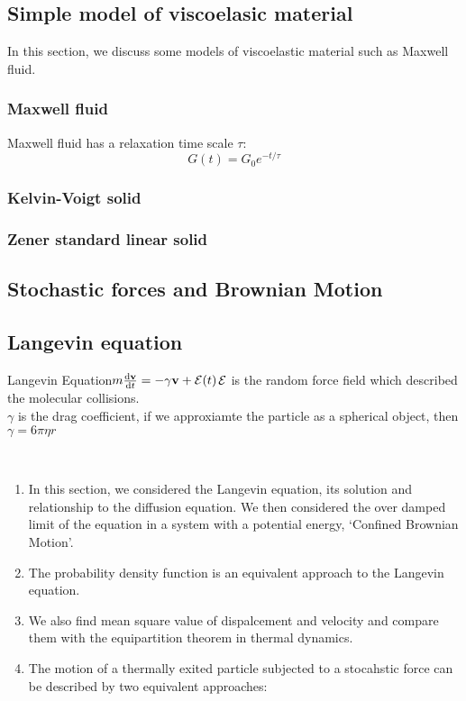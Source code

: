 \documentclass[12pt,a4paper]{article}
\begin{document}
\subsection{Simple model of viscoelasic material}
In this section, we discuss some models of viscoelastic material such as Maxwell fluid. 
    \subsubsection{Maxwell fluid}
    Maxwell fluid has a relaxation time scale $\tau$:
    $$
        G(t) = G_0 e^{-t/\tau}
    $$
    \subsubsection{Kelvin-Voigt solid}
    \subsubsection{Zener standard linear solid}
\subsection{Stochastic forces and Brownian Motion}
\subsection{Langevin equation}
\begin{definition}
    {Langevin Equation}{$m\dv{\vb{v}}{t}=-\gamma \vb{v}+\vb{\mathcal{E}}(t)$}{$\vb{\mathcal{E}}$ is the random force field which described the molecular collisions.\\$\gamma$ is the drag coefficient, if we approxiamte the particle as a spherical object, then $\gamma=6\pi\eta r$}
\end{definition}
\\
\begin{enumerate}
    \item In this section, we considered the Langevin equation, its solution and relationship to the diffusion equation. We then considered the over damped limit of the equation in a system with a potential energy, `Confined Brownian Motion'.
    \item The probability density function is an equivalent approach to the Langevin equation.
    \item We also find mean square value of dispalcement and velocity and compare them with the equipartition theorem in thermal dynamics.
    \item The motion of a thermally exited particle subjected to a stocahstic force can be described by two equivalent approaches:
\end{enumerate}
\end{document}
